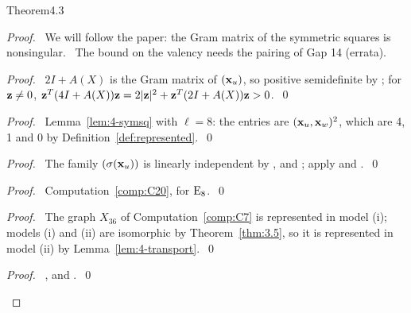 \begin{cgss}{Theorem}{4.3}\label{thm:4.3}
\end{cgss}
\begin{proof}
 \pfsketch\ We will follow the paper: the Gram matrix of the symmetric squares is
 nonsingular. \repair\ The bound on the valency needs the pairing of Gap 14 (errata).
 \begin{proof}\pf\ $2I+A(X)$ is the Gram matrix of $({\mathbf x}_u)$, so positive semidefinite by
  ; for ${\mathbf z}\ne0$,
  ${\mathbf z}^T(4I+A(X)){\mathbf z}=2|{\mathbf z}|^2+{\mathbf z}^T(2I+A(X)){\mathbf z}>0$.~\qed\end{proof}
 \begin{proof}\pf\ Lemma~\ref{lem:4-symsq} with $\ell=8$: the entries are $({\mathbf x}_u,{\mathbf x}_w)^2$,
  which are 4, 1 and 0 by Definition~\ref{def:represented}.~\qed\end{proof}
 \begin{proof}\pf\ The family $(\sigma({\mathbf x}_u))$ is linearly independent by ,
   and ; apply
   and
  .~\qed\end{proof}
 \begin{proof}\pf\ Computation~\ref{comp:C20}, for $\mathrm{E}_8$.~\qed\end{proof}
 \begin{proof}\pf\ The graph $X_{36}$ of Computation~\ref{comp:C7} is represented in model (i);
  models (i) and (ii) are isomorphic by Theorem~\ref{thm:3.5}, so it is represented in model
  (ii) by Lemma~\ref{lem:4-transport}.~\qed\end{proof}
 \qedstep
 \begin{proof}\pf\ ,  and .~\qed\end{proof}
\end{proof}



